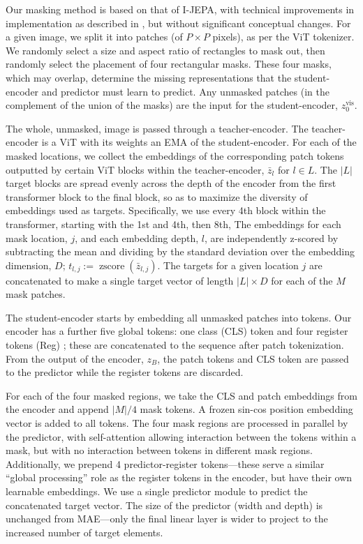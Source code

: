  Our masking method is based on that of I-JEPA, with technical improvements in implementation as described in \iftoggle{arxiv}{\cref{s:masking-implementation-improvements}}{the supplementary materials}, but without significant conceptual changes.
For a given image, we split it into patches (of $P\times P$ pixels), as per the ViT tokenizer.
We randomly select a size and aspect ratio of rectangles to mask out, then randomly select the placement of four rectangular masks.
These four masks, which may overlap, determine the missing representations that the student-encoder and predictor must learn to predict.
Any unmasked patches (in the complement of the union of the masks) are the input for the student-encoder, $z_0^\text{vis}$.

The whole, unmasked, image is passed through a teacher-encoder.
The teacher-encoder is a ViT with its weights an EMA of the student-encoder.
For each of the masked locations, we collect the embeddings of the corresponding patch tokens outputted by certain ViT blocks within the teacher-encoder, $\bar{z}_l$ for $l \in L$.
The $|L|$ target blocks are spread evenly across the depth of the encoder from the first transformer block to the final block, so as to maximize the diversity of embeddings used as targets.
Specifically, we use every 4th block within the transformer, starting with the 1st and 4th, then 8th, \etc{}%
The embeddings for each mask location, $j$, and each embedding depth, $l$, are independently z-scored by subtracting the mean and dividing by the standard deviation over the embedding dimension, $D$; $t_{l,j}:=\operatorname{zscore}(\bar{z}_{l,j})$.
The targets for a given location $j$ are concatenated to make a single target vector of length $|L| \times D$ for each of the $M$ mask patches.

The student-encoder starts by embedding all unmasked patches into tokens.
Our encoder has a further five global tokens: one class (CLS) token and four register tokens (Reg) \citep{darcet2024registers}; these are concatenated to the sequence after patch tokenization.
From the output of the encoder, $z_B$, the patch tokens and CLS token are passed to the predictor while the register tokens are discarded.


For each of the four masked regions, we take the CLS and patch embeddings from the encoder and append $|M|/4$ mask tokens.
A frozen sin-cos position embedding vector is added to all tokens.
The four mask regions are processed in parallel by the predictor, with self-attention allowing interaction between the tokens within a mask, but with no interaction between tokens in different mask regions.
Additionally, we prepend 4 predictor-register tokens---these serve a similar ``global processing'' role as the register tokens in the encoder, but have their own learnable embeddings.
We use a single predictor module to predict the concatenated target vector.
The size of the predictor (width and depth) is unchanged from MAE---only the final linear layer is wider to project to the increased number of target elements.



